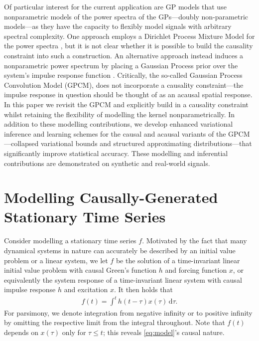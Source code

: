 \documentclass{article}
\newcommand{\id}[1]{\, \mathrm{d} #1}     %
\begin{document}
Of particular interest for the current application are GP models that use nonparametric models of the power spectra of the GPs---doubly non-parametric models---as they have the capacity to flexibly model signals with arbitrary spectral complexity. One approach employs a Dirichlet Process Mixture Model for the power spectra \cite{Oliva:2015:Bayesian_Nonparametric_Kernel-Learning}, but it is not clear whether it is possible to build the causality constraint into such a construction. An alternative approach instead induces a nonparametric power spectrum by placing a Gaussian Process prior over the system's impulse response function \cite{Tobar:2015:Learning_Stationary}. Critically, the so-called Gaussian Process Convolution Model (GPCM), does not incorporate a causality constraint---the impulse response in question should be thought of as an acausal spatial response. In this paper we revisit the GPCM and explicitly build in a causality constraint whilst retaining the flexibility of modelling the kernel nonparametrically. In addition to these modelling contributions, we develop enhanced variational inference and learning schemes for the causal and acausal variants of the GPCM---collapsed variational bounds and structured approximating distributions---that significantly improve statistical accuracy. These modelling and inferential contributions are demonstrated on synthetic and real-world signals.

\section{Modelling Causally-Generated Stationary Time Series}
%
Consider modelling a stationary time series $f$. Motivated by the fact that many dynamical systems in nature can accurately be described by an initial value problem or a linear system, we let $f$ be the solution of a time-invariant linear initial value problem with causal Green's function $h$ and forcing function $x$, or equivalently the system response of a time-invariant linear system with causal impulse response $h$ and excitation $x$. It then holds that
\begin{align} \label{eq:model}
    f(t) = \int^t h(t- \tau)x(\tau)\id{\tau}.
\end{align}
For parsimony, we denote integration from negative infinity or to positive infinity by omitting the respective limit from the integral throughout.
Note that $f(t)$ depends on $x(\tau)$ only for $\tau \le t$; this reveals \cref{eq:model}'s causal nature.
\end{document}
